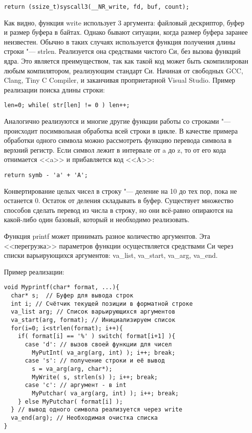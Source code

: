 \documentclass[10pt, a5paper]{article}
\begin{document}
\begin{lstlisting}
return (ssize_t)syscall3(__NR_write, fd, buf, count);
\end{lstlisting}

Как видно, функция write использует 3 аргумента: файловый дескриптор, буфер и размер буфера в байтах. Однако бывают ситуации, когда размер буфера заранее неизвестен. Обычно в таких случаях используется функция получения длины строки "--- strlen. Реализуется она средствами чистого Си, без вызова функций ядра. Это является преимуществом, так как такой код может быть скомпилирован любым компилятором, реализующим стандарт Си. Начиная от свободных GCC, Clang, Tiny C Compiler, и заканчивая проприетарной Visual Studio. Пример реализации поиска длины строки:

\begin{lstlisting}
len=0; while( str[len] != 0 ) len++;
\end{lstlisting}

Аналогично реализуются и многие другие функции работы со строками "--- происходит посимвольная обработка всей строки в цикле. В качестве примера обработки одного символа можно рассмотреть функцию перевода символа в верхний регистр. Если символ лежит в интервале от a до z, то от его кода отнимается <<a>> и прибавляется код <<A>>:

\begin{lstlisting}
return symb - 'a' + 'A';
\end{lstlisting}

Конвертирование целых чисел в строку "--- деление на 10 до тех пор, пока не останется 0. Остаток от деления складывать в буфер. Существует множество способов сделать перевод из числа в строку, но они всё-равно опираются на какой-либо один базовый, который и необходимо реализовать.

Функция printf может принимать разное количество аргументов. Эта <<перегрузка>> параметров функции осуществляется средствами Си через списки варьирующихся аргументов: va\_list, \linebreak va\_start, va\_arg, va\_end.

Пример реализации:

\begin{verbatim}
void Myprintf(char* format, ...){
  char* s;  // Буфер для вывода строк 
  int i; // Счётчик текущей позиции в форматной строке
  va_list arg; // Список варьирующихся аргументов
  va_start(arg, format); // Инициализируем список
  for(i=0; i<strlen(format); i++){
    if( format[i] == '%' ) switch( format[i+1] ){
      case 'd': // вызов своей функции для чисел
        MyPutInt( va_arg(arg, int) ); i++; break;
      case 's': // получение строки и её вывод
        s = va_arg(arg, char*);  
        MyWrite( s, strlen(s) ); i++; break;
      case 'c': // аргумент - в int
        MyPutchar( va_arg(arg, int) ); i++; break;
    } else MyPutchar( format[i] );
  } // вывод одного символа реализуется через write
  va_end(arg); // Необходимая очистка списка
}
\end{verbatim}
\end{document}
